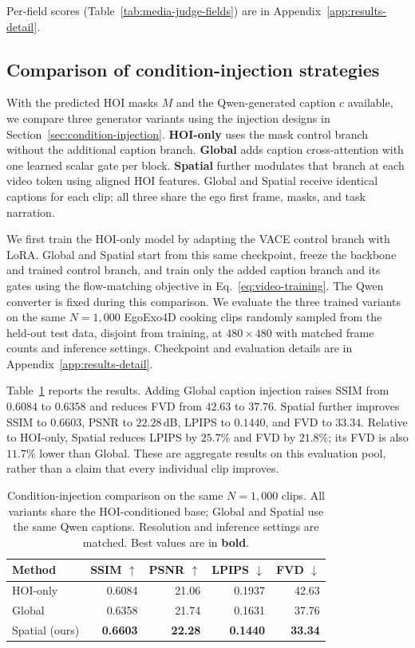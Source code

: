 \documentclass{article} %
\begin{document}
Per-field scores (Table~\ref{tab:media-judge-fields}) are in
Appendix~\ref{app:results-detail}.

\subsection{Comparison of condition-injection strategies}
\label{sec:stage1}
\label{sec:stage2}

With the predicted HOI masks $M$ and the Qwen-generated caption $c$
available, we compare three generator variants using the injection designs
in Section~\ref{sec:condition-injection}. \textbf{HOI-only} uses the mask
control branch without the additional caption branch. \textbf{Global}
adds caption cross-attention with one learned scalar gate per block.
\textbf{Spatial} further modulates that branch at each video token using
aligned HOI features. Global and Spatial receive identical captions for
each clip; all three share the ego first frame, masks, and task narration.

We first train the HOI-only model by adapting the VACE control branch with
LoRA. Global and Spatial start from this same checkpoint, freeze the
backbone and trained control branch, and train only the added caption
branch and its gates using the flow-matching objective in
Eq.~\ref{eq:video-training}. The Qwen converter is fixed during this
comparison. We evaluate the three trained variants on the same $N{=}1{,}000$
EgoExo4D cooking clips randomly sampled from the held-out test data,
disjoint from training, at
$480\times480$ with matched frame counts and inference settings.
Checkpoint and evaluation details are in Appendix~\ref{app:results-detail}.

Table~\ref{tab:phase2-testpool} reports the results. Adding Global caption
injection raises SSIM from $0.6084$ to $0.6358$ and reduces FVD from
$42.63$ to $37.76$. Spatial further improves SSIM to $0.6603$, PSNR to
$22.28$\,dB, LPIPS to $0.1440$, and FVD to $33.34$. Relative to HOI-only,
Spatial reduces LPIPS by $25.7\%$ and FVD by $21.8\%$; its FVD is also
$11.7\%$ lower than Global. These are aggregate results on this evaluation
pool, rather than a claim that every individual clip improves.

\begin{table}[h]
\centering
\footnotesize
\captionsetup{font=footnotesize}
\caption{Condition-injection comparison on the same $N{=}1{,}000$ clips.
All variants share the HOI-conditioned base; Global and Spatial use the
same Qwen captions. Resolution and inference settings are matched.
Best values are in \textbf{bold}.}
\label{tab:phase2-testpool}
\begin{tabular}{lrrrr}
\toprule
Method & SSIM $\uparrow$ & PSNR $\uparrow$ & LPIPS $\downarrow$ & FVD $\downarrow$ \\
\midrule
HOI-only & 0.6084 & 21.06 & 0.1937 & 42.63 \\
Global & 0.6358 & 21.74 & 0.1631 & 37.76 \\
Spatial (ours) & \textbf{0.6603} & \textbf{22.28} & \textbf{0.1440} & \textbf{33.34} \\
\bottomrule
\end{tabular}
\end{table}
\end{document}
